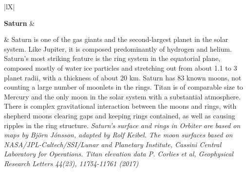 \documentclass[Orbiter User Manual.tex]{subfiles}
\begin{document}
\begin{table}[H]
	\begin{tabularx}{\textwidth}{ |lX| }
	\hline\rule{0pt}{2ex}
	\textbf{Saturn} &\\
	\hline\rule{0pt}{2ex}
	& \vfill
	Saturn is one of the gas giants and the second-largest planet in the solar system. Like Jupiter, it is composed predominantly of hydrogen and helium. Saturn’s most striking feature is the ring system in the equatorial plane, composed mostly of water ice particles and stretching out from about 1.1 to 3 planet radii, with a thickness of about 20 km.\newline
	Saturn has 83 known moons, not counting a large number of moonlets in the rings. Titan is of comparable size to Mercury and the only moon in the solar system with a substantial atmosphere. There is complex gravitational interaction between the moons and rings, with shepherd moons clearing gaps and keeping rings contained, as well as causing ripples in the ring structure.\newline
	\newline
	\textit{Saturn’s surface and rings in Orbiter are based on maps by Björn Jónsson, adapted by Rolf Keibel. The moon surfaces based on NASA/JPL-Caltech/SSI/Lunar and Planetary Institute, Cassini Central Laboratory for Operations. Titan elevation data P. Corlies et al, Geophysical Research Letters 44(23), 11754-11761 (2017)}\\
	\hline
	\end{tabularx}
\end{table}
\end{document}
